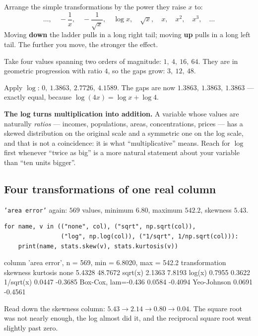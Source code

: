 \documentclass[11pt]{article}
\begin{document}
Arrange the simple transformations by the power they raise $x$ to:
\[
  \dots,\quad -\frac{1}{x},\quad -\frac{1}{\sqrt x},\quad \log x,\quad
  \sqrt x,\quad x,\quad x^2,\quad x^3,\quad \dots
\]
Moving \textbf{down} the ladder pulls in a long right tail; moving \textbf{up}
pulls in a long left tail. The further you move, the stronger the effect.

\begin{worked}
Take four values spanning two orders of magnitude: $1,\ 4,\ 16,\ 64$. They are
in geometric progression with ratio $4$, so the gaps grow: $3,\ 12,\ 48$.

Apply $\log$: $0,\ 1.3863,\ 2.7726,\ 4.1589$. The gaps are now
$1.3863,\ 1.3863,\ 1.3863$ --- exactly equal, because
$\log(4x) = \log x + \log 4$.

\textbf{The log turns multiplication into addition.} A variable whose values
are naturally \emph{ratios} --- incomes, populations, areas, concentrations,
prices --- has a skewed distribution on the original scale and a symmetric one
on the log scale, and that is not a coincidence: it is what ``multiplicative''
means. Reach for $\log$ first whenever ``twice as big'' is a more natural
statement about your variable than ``ten units bigger''.
\end{worked}

\subsection{Four transformations of one real column}

\texttt{'area error'} again: $569$ values, minimum $6.80$, maximum $542.2$,
skewness $5.43$.

\begin{lstlisting}
for name, v in (("none", col), ("sqrt", np.sqrt(col)),
                ("log", np.log(col)), ("1/sqrt", 1/np.sqrt(col))):
    print(name, stats.skew(v), stats.kurtosis(v))
\end{lstlisting}
\begin{codeout}
column 'area error',  n = 569,  min = 6.8020, max = 542.2
  transformation        skewness    kurtosis
  none                    5.4328    48.7672
  sqrt(x)                 2.1363     7.8193
  log(x)                  0.7955     0.3622
  1/sqrt(x)               0.0447    -0.3685
  Box-Cox, lam=-0.436     0.0584    -0.4094
  Yeo-Johnson             0.0691    -0.4561
\end{codeout}

Read down the skewness column: $5.43 \to 2.14 \to 0.80 \to 0.04$. The square
root was not nearly enough, the log almost did it, and the reciprocal square
root went slightly past zero.
\end{document}

